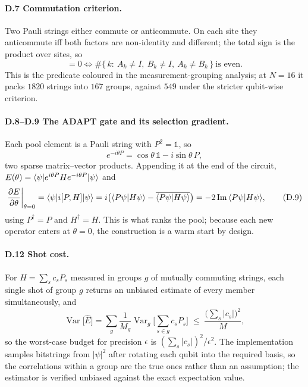 \paragraph{\textsf{D.7} Commutation criterion.}
Two Pauli strings either commute or anticommute. On each site they
anticommute iff both factors are non-identity and different; the total sign is
the product over sites, so
\begin{equation}
  [A,B]=0 \iff
  \#\{\,k:\ A_k\neq I,\ B_k\neq I,\ A_k\neq B_k\,\}\ \text{is even}.
  \tag{D.7}
\end{equation}
This is the predicate coloured in the measurement-grouping analysis; at $N=16$
it packs $1820$ strings into $167$ groups, against $549$ under the stricter
qubit-wise criterion.

\paragraph{\textsf{D.8}--\textsf{D.9} The ADAPT gate and its selection
gradient.}
Each pool element is a Pauli string with $P^2=\mathbb{1}$, so
\begin{equation}
  e^{-i\theta P} = \cos\theta\,\mathbb{1} - i\sin\theta\,P ,
  \tag{D.8}
\end{equation}
two sparse matrix--vector products. Appending it at the end of the circuit,
$E(\theta)=\langle \psi \rvert e^{i\theta P}He^{-i\theta P}\lvert \psi \rangle$ and
\begin{equation}
  \left.\frac{\partial E}{\partial\theta}\right|_{\theta=0}
  = \langle \psi \rvert i[P,H]\lvert \psi \rangle
  = i\big(\langle P\psi | H\psi \rangle-\overline{\langle P\psi | H\psi \rangle}\big)
  = -2\,\mathrm{Im}\,\langle P\psi | H\psi \rangle,
  \tag{D.9}
\end{equation}
using $P^\dagger=P$ and $H^\dagger=H$. This is what ranks the pool; because
each new operator enters at $\theta=0$, the construction is a warm start by
design.

\paragraph{\textsf{D.12} Shot cost.}
For $H=\sum_s c_s P_s$ measured in groups $g$ of mutually commuting strings,
each single shot of group $g$ returns an unbiased estimate of every member
simultaneously, and
\begin{equation}
  \operatorname{Var}\big[\hat E\big]
  = \sum_g \frac{1}{M_g}
    \operatorname{Var}_g\Big[\sum_{s\in g}c_s P_s\Big]
  \;\le\; \frac{\big(\sum_s|c_s|\big)^2}{M},
  \tag{D.12}
\end{equation}
so the worst-case budget for precision $\epsilon$ is
$(\sum_s |c_s|)^2/\epsilon^2$. The implementation samples bitstrings from
$|\psi|^2$ after rotating each qubit into the required basis, so the
correlations within a group are the true ones rather than an assumption; the
estimator is verified unbiased against the exact expectation value.

